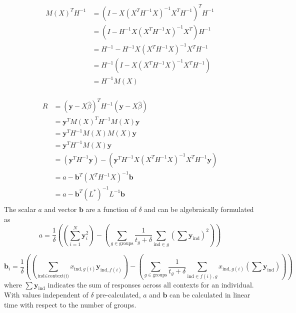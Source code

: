         \begin{align}
        \begin{split}
            M(X)^TH^{-1} & = (I - X(X^TH^{-1}X)^{-1}X^TH^{-1})^T H^{-1} \\
                         & = (I - H^{-1}X(X^TH^{-1}X)^{-1}X^T)H^{-1} \\
                         & = H^{-1} - H^{-1}X(X^TH^{-1}X)^{-1}X^TH^{-1} \\
                         & = H^{-1}(I - X(X^TH^{-1}X)^{-1}X^TH^{-1}) \\
                         & = H^{-1}M(X)
        \end{split}
        \end{align}
    
        \begin{align}
        \begin{split}
            R & = (\mathbf{y}-X\hat{\beta})^TH^{-1}(\mathbf{y}-X\hat{\beta})    \\
              & = \mathbf{y}^TM(X)^TH^{-1}M(X)\mathbf{y} \\
              & = \mathbf{y}^TH^{-1}M(X)M(X)\mathbf{y} \\
              & = \mathbf{y}^TH^{-1}M(X)\mathbf{y} \\
              & = (\mathbf{y}^TH^{-1}\mathbf{y}) - (\mathbf{y}^TH^{-1}X(X^TH^{-1}X)^{-1}X^TH^{-1}\mathbf{y}) \\
              & = a - \mathbf{b}^T(X^TH^{-1}X)^{-1}\mathbf{b} \\
              & = a - \mathbf{b}^T(L^*)^{-1}L^{-1}\mathbf{b}
        \end{split}
        \end{align}
        The scalar $a$ and vector $\mathbf{b}$ are a function of $\delta$ and can be algebraically formulated as
        \begin{equation}
            a = \frac{1}{\delta}\left(\left(\sum_{i=1}^{N}\mathbf{y}_i^2\right) - \left(\sum\limits_{g \in \text{groups}} \frac{1}{t_g + \delta}\sum\limits_{\text{ind} \in g}(\sum\mathbf{y}_{\text{ind}})^2\right)\right)
        \end{equation}
        
        \begin{equation}
            \mathbf{b}_i = \frac{1}{\delta}\left(\left(\sum\limits_{\text{ind} \in \text{context(i)}} x_{\text{ind},g(i)}\mathbf{y}_{\text{ind},f(i)}\right) - \left(\sum\limits_{g \in \text{groups}} \frac{1}{t_g + \delta}\sum\limits_{\text{ind} \in f(i),g} x_{\text{ind},g(i)}(\sum\mathbf{y}_{\text{ind}}) \right)\right)
        \end{equation}
        where $\sum\mathbf{y}_{\text{ind}}$ indicates the sum of responses across all contexts for an individual. With values independent of $\delta$ pre-calculated, $a$ and $\mathbf{b}$ can be calculated in linear time with respect to the number of groups. 
        
